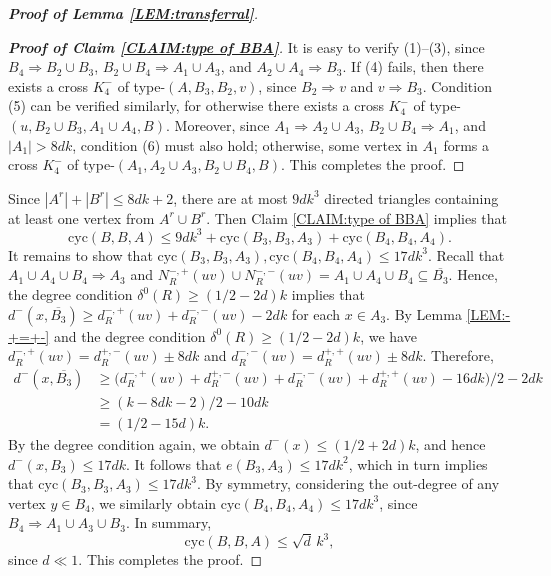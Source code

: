 \documentclass[11pt,a4paper,reqno]{amsart}
\theoremstyle{definition} %
\begin{document}
\begin{proof}[\textbf{Proof of Lemma \ref{LEM:transferral}}]
\begin{proof}[\textbf{Proof of Claim \ref{CLAIM:type of BBA}}]
It is easy to verify (1)--(3), since
$B_4\Rightarrow B_2\cup B_3$,
$B_2\cup B_4\Rightarrow A_1\cup A_3$,
and
$A_2\cup A_4\Rightarrow B_3$.
If (4) fails, then there exists a cross $K_4^-$ of type-$(A,B_3,B_2,v)$, since $B_2\Rightarrow v$ and $v\Rightarrow B_3$.
Condition (5) can be verified similarly, for otherwise there exists a cross $K_4^-$ of type-$(u,B_2\cup B_3,A_1\cup A_4,B)$.
Moreover, since $A_1\Rightarrow A_2\cup A_3$, $B_2\cup B_4\Rightarrow A_1$, and $|A_1|>8dk$, condition (6) must also hold; otherwise, some vertex in $A_1$ forms a cross $K_4^-$ of type-$(A_1,A_2\cup A_3,B_2\cup B_4,B)$.
This completes the proof.
\end{proof}

Since $|A^r|+|B^r|\leqslant 8dk+2$, there are at most $9dk^3$ directed triangles containing at least one vertex from $A^r\cup B^r$. Then Claim \ref{CLAIM:type of BBA} implies that
$$
\text{cyc}(B,B,A)\leqslant 9dk^3+\text{cyc}(B_3,B_3,A_3)+\text{cyc}(B_4,B_4,A_4).
$$
It remains to show that
$\text{cyc}(B_3,B_3,A_3),\text{cyc}(B_4,B_4,A_4)\leqslant 17dk^3$.
Recall that
$A_1\cup A_4\cup B_4\Rightarrow A_3$
and
$N_R^{-,+}(uv)\cup N_R^{-,-}(uv)=A_1\cup A_4\cup B_4\subseteq \overline{B_3}$.
Hence, the degree condition $\delta^0(R)\geqslant(1/2-2d)k$ implies that $d^-(x,\overline{B_3})\geqslant d_R^{-,+}(uv)+d_R^{-,-}(uv)-2dk$ 
for each $x\in A_3$.
By Lemma \ref{LEM:-+=+-} and the degree condition $\delta^0(R)\geqslant(1/2-2d)k$, we have
$d_R^{-,+}(uv)=d_R^{+,-}(uv)\pm 8dk$
and
$d_R^{-,-}(uv)=d_R^{+,+}(uv)\pm 8dk$.
Therefore,
\begin{align*}
d^-(x,\overline{B_3})
&\geqslant \bigl(d_R^{-,+}(uv)+d_R^{+,-}(uv)+d_R^{-,-}(uv)+d_R^{+,+}(uv)-16dk\bigr)/2-2dk\\
&\geqslant (k-8dk-2)/2-10dk\\
&=(1/2-15d)k.
\end{align*}
By the degree condition  again, we obtain $d^-(x)\leqslant (1/2+2d)k$, and hence
$d^-(x,B_3)\leqslant 17dk$.
It follows that $e(B_3,A_3)\leqslant 17dk^2$, which in turn implies that
$\text{cyc}(B_3,B_3,A_3)\leqslant 17dk^3$.
By symmetry, considering the out-degree of any vertex $y\in B_4$, we similarly obtain
$\text{cyc}(B_4,B_4,A_4)\leqslant 17dk^3$,
since $B_4\Rightarrow A_1\cup A_3\cup B_3$.
In summary,
$$
\text{cyc}(B,B,A)\leqslant \sqrt d\, k^3,
$$
since $d\ll 1$.
This completes the proof.
\end{proof}
\end{document}
